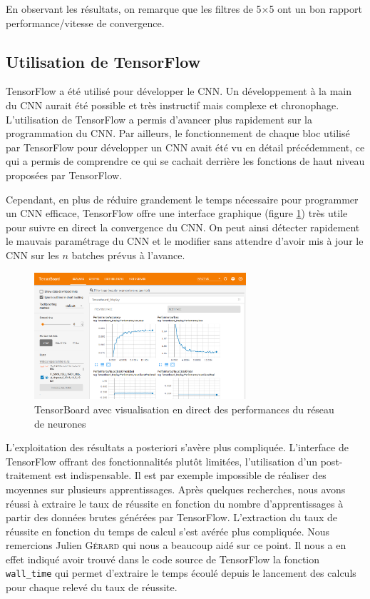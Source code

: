 En observant les résultats, on remarque que les filtres de 5$\times$5 ont un bon rapport performance/vitesse de convergence.


\subsection{Utilisation de TensorFlow}

TensorFlow a été utilisé pour développer le CNN. Un développement à la main du CNN aurait été possible et très instructif mais complexe et chronophage. L'utilisation de TensorFlow a permis d'avancer plus rapidement sur la programmation du CNN. Par ailleurs, le fonctionnement de chaque bloc utilisé par TensorFlow pour développer un CNN avait été vu en détail précédemment, ce qui a permis de comprendre ce qui se cachait derrière les fonctions de haut niveau proposées par TensorFlow.

Cependant, en plus de réduire grandement le temps nécessaire pour programmer un CNN efficace, TensorFlow offre une interface graphique (figure \ref{fig:interface_TF}) très utile pour suivre en direct la convergence du CNN. On peut ainsi détecter rapidement le mauvais paramétrage du CNN et le modifier sans attendre d'avoir mis à jour le CNN sur les $n$ batches prévus à l'avance.

\begin{figure}[h]
 \centering
 \includegraphics[width=0.7\textwidth]{img/interface_TF.png}
 \caption{TensorBoard avec visualisation en direct des performances du réseau de neurones}
 \label{fig:interface_TF}
\end{figure}


L'exploitation des résultats a posteriori s'avère plus compliquée. L'interface de TensorFlow offrant des fonctionnalités plutôt limitées, l'utilisation d'un post-traitement est indispensable. Il est par exemple impossible de réaliser des moyennes sur plusieurs apprentissages. Après quelques recherches, nous avons réussi à extraire le taux de réussite en fonction du nombre d'apprentissages à partir des données brutes générées par TensorFlow. L'extraction du taux de réussite en fonction du temps de calcul s'est avérée plus compliquée. Nous remercions Julien \textsc{Gérard} qui nous a beaucoup aidé sur ce point. Il nous a en effet indiqué avoir trouvé dans le code source de TensorFlow la fonction \verb|wall_time| qui permet d'extraire le temps écoulé depuis le lancement des calculs pour chaque relevé du taux de réussite.

